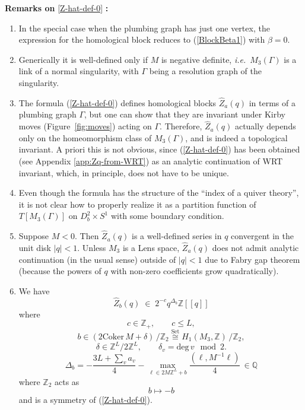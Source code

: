 \documentclass[hyper,letterpaper]{JHEP3}
\newcommand{\Z}{{\mathbb Z}}
\newcommand{\Q}{{\mathbb Q}}
\renewcommand{\hat}{\widehat}
\def\ie{{\textit{i.e.}}}
\begin{document}
{\bf Remarks on} \eqref{Z-hat-def-0} {\bf :}
\begin{enumerate}

\item In the special case when the plumbing graph has just one vertex, the expression for the homological block reduces to (\ref{BlockBeta1}) with $\beta=0$.
	
\item Generically it is well-defined only if $M$ is negative definite, \ie~$M_3(\Gamma)$ is a link of a normal singularity, with $\Gamma$ being a resolution graph of the singularity.
	
\item The formula (\ref{Z-hat-def-0}) defines homological blocks $\hat{Z}_a(q)$ in terms of a plumbing graph $\Gamma$, but one can show that they are invariant under Kirby moves (Figure~\ref{fig:moves}) acting on $\Gamma$. Therefore, $\hat{Z}_a(q)$ actually depends only on the homeomorphism class of $M_3(\Gamma)$, and is indeed a topological invariant. A priori this is not obvious, since (\ref{Z-hat-def-0}) has been obtained (see Appendix  \ref{app:Zq-from-WRT}) as an analytic continuation of WRT invariant, which, in principle, does not have to be unique.
	
\item Even though the formula has the structure of the ``index of a quiver theory'', it is not clear how to properly realize it as a partition function of $T[M_3(\Gamma)]$ on $D^2_b\times S^1$ with some boundary condition.
				
\item Suppose $M<0$. Then $\hat{Z}_a(q)$ is a well-defined series in $q$ convergent in the unit disk $|q|<1$. Unless $M_3$ is a Lens space, $\hat{Z}_a(q)$ does not admit analytic continuation (in the usual sense) outside of $|q|<1$ due to Fabry gap theorem (because the powers of $q$ with non-zero coefficients grow quadratically).

\item We have
	\begin{equation}
	\hat Z_b(q)
	\;\in\; 2^{-c}q^{\Delta_b}\Z[[q]]
	\end{equation}
	where
	\begin{equation}
	 c\in \Z_+,\qquad c\leq L,
	\end{equation}
	\begin{equation}
	  b\in (2\text{Coker}\,M+\delta)\,/\Z_2
	\stackrel{\text{Set}}{\cong} H_1(M_3,\Z)\,/\Z_2,
	\end{equation}
	\begin{equation}
	    \delta\in \Z^L/2\Z^L,\qquad \delta_v = \text{deg}\,v \mod 2.
	\end{equation}
	\begin{equation}
	 \Delta_b=-\frac{3L+\sum_v a_{v}}{4}-\max_{\ell \in 2M\Z^L+b}\frac{(\ell,M^{-1}\ell)}{4}\,\in \Q
	\end{equation}
	where $\Z_2$ acts as
	\begin{equation}
	 b\mapsto -b
	\end{equation}
	and is a symmetry of (\ref{Z-hat-def-0}).
	
\end{enumerate}
\end{document}

